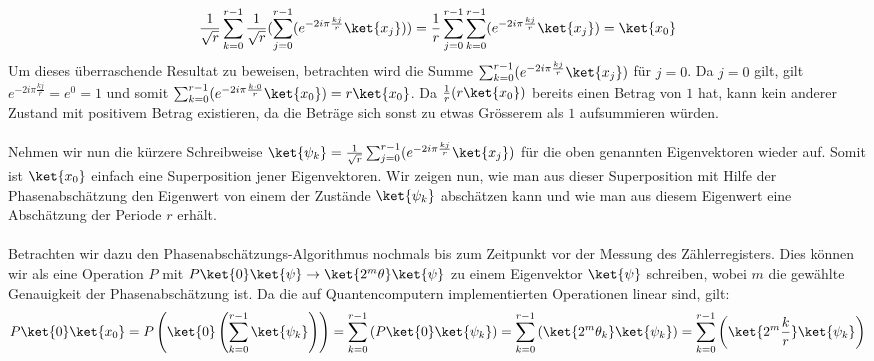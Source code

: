\begin{align*}
    \frac{1}{\sqrt{r}}\sum_{k = 0}^{r - 1}\frac{1}{\sqrt{r}}(\sum_{j = 0}^{r - 1}(e^{-2i\pi\frac{kj}{r}}\ket{x_j})) = \frac{1}{r}\sum_{j = 0}^{r - 1}\sum_{k = 0}^{r - 1}(e^{-2i\pi\frac{kj}{r}}\ket{x_j}) = \ket{x_0}
\end{align*}
Um dieses überraschende Resultat zu beweisen, betrachten wird die Summe $\sum_{k = 0}^{r - 1}(e^{-2i\pi\frac{kj}{r}}\ket{x_j})$ für $j = 0$. Da $j = 0$ gilt, gilt $e^{-2i\pi\frac{kj}{r}} = e^{0} = 1$ und somit $\sum_{k = 0}^{r - 1}(e^{-2i\pi\frac{k\cdot 0}{r}}\ket{x_0}) = r\ket{x_0}$. Da $\frac{1}{r}(r\ket{x_0})$ bereits einen Betrag von $1$ hat, kann kein anderer Zustand mit positivem Betrag existieren, da die Beträge sich sonst zu etwas Grösserem als $1$ aufsummieren würden.

\paragraph{}

Nehmen wir nun die kürzere Schreibweise $\ket{\psi_k} = \frac{1}{\sqrt{r}}\sum_{j = 0}^{r - 1}(e^{-2i\pi\frac{kj}{r}}\ket{x_j})$ für die oben genannten Eigenvektoren wieder auf. Somit ist $\ket{x_0}$ einfach eine Superposition jener Eigenvektoren. Wir zeigen nun, wie man aus dieser Superposition mit Hilfe der Phasenabschätzung den Eigenwert von einem der Zustände $\ket{\psi_k}$ abschätzen kann und wie man aus diesem Eigenwert eine Abschätzung der Periode $r$ erhält.

\paragraph{}
Betrachten wir dazu den Phasenabschätzungs-Algorithmus nochmals bis zum Zeitpunkt vor der Messung des Zählerregisters. Dies können wir als eine Operation $P$ mit $P\ket{0}\ket{\psi} \rightarrow \ket{2^m\theta}\ket{\psi}$ zu einem Eigenvektor $\ket{\psi}$ schreiben, wobei $m$ die gewählte Genauigkeit der Phasenabschätzung ist. Da die auf Quantencomputern implementierten Operationen linear sind, gilt: $$P\ket{0}\ket{x_0} = P\left(\ket{0}\left(\sum_{k = 0}^{r - 1}\ket{\psi_k}\right)\right) = \sum_{k = 0}^{r - 1}\left(P\ket{0}\ket{\psi_k}\right) = \sum_{k = 0}^{r - 1}\left(\ket{2^m\theta_k}\ket{\psi_k}\right) = \sum_{k = 0}^{r - 1}\left(\ket{2^m\frac{k}{r}}\ket{\psi_k}\right)$$

